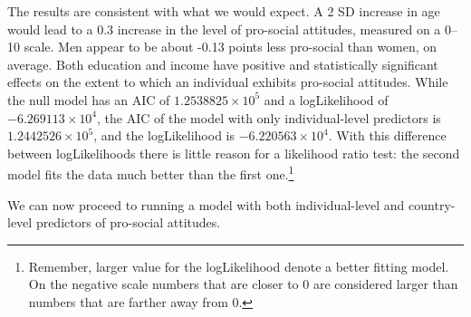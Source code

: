 \documentclass[12pt,english]{article}\usepackage[]{graphicx}\usepackage[usenames, dvipsnames]{xcolor}
\begin{document}
The results are consistent with what we would expect. A 2 SD increase in age would lead to a 0.3 increase in the level of pro-social attitudes, measured on a 0--10 scale. Men appear to be about -0.13 points less pro-social than women, on average. Both education and income have positive and statistically significant effects on the extent to which an individual exhibits pro-social attitudes. While the null model has an AIC of \ensuremath{1.2538825\times 10^{5}} and a logLikelihood of \ensuremath{-6.269113\times 10^{4}}, the AIC of the model with only individual-level predictors is \ensuremath{1.2442526\times 10^{5}}, and the logLikelihood is \ensuremath{-6.220563\times 10^{4}}. With this difference between logLikelihoods there is little reason for a likelihood ratio test: the second model fits the data much better than the first one.\footnote{Remember, larger value for the logLikelihood denote a better fitting model. On the negative scale numbers that are closer to 0 are considered larger than numbers that are farther away from 0.}

We  can now proceed to running a model with both individual-level and country-level predictors of pro-social attitudes.
\end{document}
